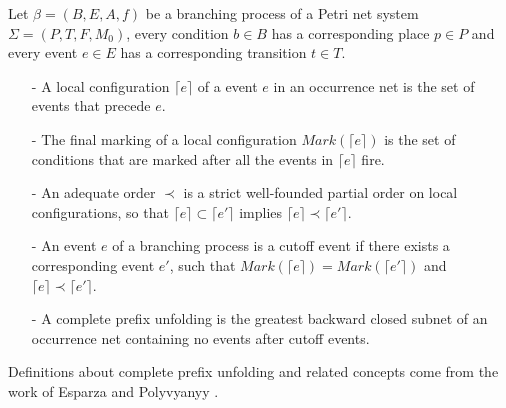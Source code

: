 \documentclass{llncs}
\begin{document}
\begin{definition}\label{def:cpu}
Let $\beta=(B,E,A,f)$ be a branching process of a Petri net system $\Sigma=(P,T,F,M_{0})$, every condition $b\in B$ has a corresponding place $p\in P$ and every event $e\in E$ has a corresponding transition $t\in T$.
	\begin{itemize}
		\item[-] A local configuration $\lceil e\rceil$ of a event $e$ in an occurrence net is the set of events that precede $e$.
		\item[-] The final marking of a local configuration $Mark(\lceil e\rceil)$ is the set of conditions that are marked after all the events in $\lceil e\rceil$ fire.
		\item[-] An adequate order $\prec$ is a strict well-founded partial order on local configurations, so that $\lceil e\rceil\subset\lceil e'\rceil$ implies $\lceil e\rceil\prec\lceil e'\rceil$.
		\item[-] An event $e$ of a branching process is a cutoff event if there exists a corresponding event $e'$, such that $Mark(\lceil e\rceil)=Mark(\lceil e'\rceil)$ and $\lceil e\rceil\prec\lceil e'\rceil$.
		\item[-] A complete prefix unfolding is the greatest backward closed subnet of an occurrence net containing no events after cutoff events.
	\end{itemize}
\end{definition}

Definitions about complete prefix unfolding and related concepts come from the work of Esparza \cite{esparza1996improvement} and Polyvyanyy \cite{polyvyanyy2010structuring}.
\end{document}
